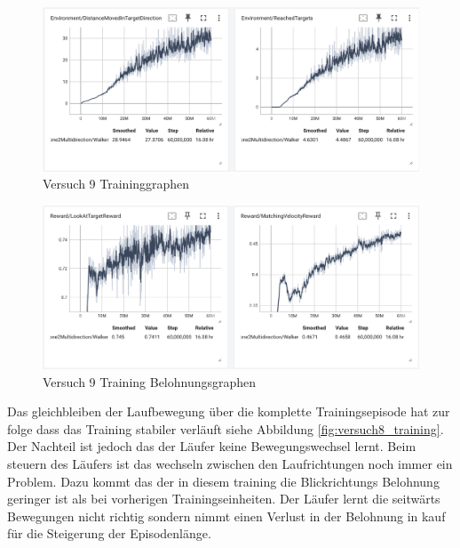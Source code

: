 \begin{figure}[H]
  \centering  
  \includegraphics[scale=0.5]{img/versuch9_training.png}
  \caption{Versuch 9 Traininggraphen}
  \label{fig:versuch9_training}
\end{figure}

\begin{figure}[H]
  \centering  
  \includegraphics[scale=0.5]{img/versuch9_training_belohnung.png}
  \caption{Versuch 9 Training Belohnungsgraphen}
  \label{fig:versuch9_training_belohnung}
\end{figure}

Das gleichbleiben der Laufbewegung über die komplette Trainingsepisode hat zur folge dass das Training stabiler verläuft siehe Abbildung \ref{fig:versuch8_training}. Der Nachteil ist jedoch das der Läufer keine Bewegungswechsel lernt. Beim steuern des Läufers ist das wechseln zwischen den Laufrichtungen noch immer ein Problem. Dazu kommt das der in diesem training die Blickrichtungs Belohnung geringer ist als bei vorherigen Trainingseinheiten. Der Läufer lernt die seitwärts Bewegungen nicht richtig sondern nimmt einen Verlust in der Belohnung in kauf für die Steigerung der Episodenlänge.